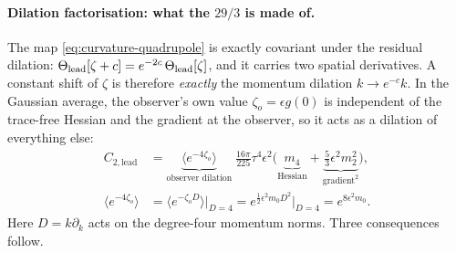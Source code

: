 \documentclass[11pt]{article}
\theoremstyle{definition}
\theoremstyle{remark}
\newcommand{\eps}{\epsilon}
\newcommand{\ens}[1]{\langle #1\rangle}
\begin{document}
\paragraph{Dilation factorisation: what the $29/3$ is made of.}
The map \eqref{eq:curvature-quadrupole} is exactly covariant under the residual dilation:
$\Theta_{\rm lead}[\zeta+c]=e^{-2c}\,\Theta_{\rm lead}[\zeta]$, and it carries two spatial
derivatives. A constant shift of $\zeta$ is therefore \emph{exactly} the momentum dilation
$k\to e^{-c}k$. In the Gaussian average, the observer's own value $\zeta_o=\eps g(0)$ is
independent of the trace-free Hessian and the gradient at the observer, so it acts as a dilation of
everything else:
\begin{equation}\label{eq:sh-dilation-factorised}
\boxed{\begin{aligned}
C_{2,\mathrm{lead}}
&=\underbrace{\ens{e^{-4\zeta_o}}}_{\text{observer dilation}}\;
\frac{16\pi}{225}\tau^4\eps^2\Big(\underbrace{m_4}_{\text{Hessian}}
+\underbrace{\tfrac53\eps^2m_2^2}_{\text{gradient}^2}\Big),\\
\ens{e^{-4\zeta_o}}&=\ens{e^{-\zeta_oD}}\big|_{D=4}=e^{\frac12\eps^2m_0D^2}\big|_{D=4}=e^{8\eps^2m_0}.
\end{aligned}}
\end{equation}
Here $D=k\partial_k$ acts on the degree-four momentum norms. Three consequences follow.
\end{document}
